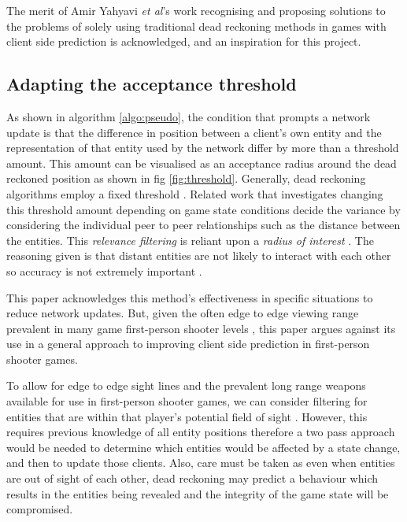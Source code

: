 \documentclass[journal]{IEEEtran}
\begin{document}
The merit of Amir Yahyavi \textit{et al}'s work \cite{yahyavi2011antreckoning} \cite{yahyavi2013interest} recognising and proposing solutions to the problems of solely using traditional dead reckoning methods in games with client side prediction is acknowledged, and an inspiration for this project.

\subsection{Adapting the acceptance threshold} \label{adaptingThreshold}

As shown in algorithm \ref{algo:pseudo}, the condition that prompts a network update is that the difference in position between a client's own entity and the representation of that entity used by the network differ by more than a threshold amount. This amount can be visualised as an acceptance radius around the dead reckoned position as shown in fig \ref{fig:threshold}. Generally, dead reckoning algorithms employ a fixed threshold \cite{cai1999auto}. Related work that investigates changing this threshold amount depending on game state conditions decide the variance by considering the individual peer to peer relationships such as the distance between the entities. This \textit{relevance filtering} is reliant upon a \textit{radius of interest} \cite{rak1996evaluation}. The reasoning given is that distant entities are not likely to interact with each other so accuracy is not extremely important  \cite{cai1999auto} \cite{jaya2016combining}.

This paper acknowledges this method's effectiveness in specific situations to reduce network updates. But, given the often edge to edge viewing range prevalent in many game first-person shooter levels \cite{toby2014tobyscs} \cite{ziervogel2014nag} \cite{cod2018wikibo4}, this paper argues against its use in a general approach to improving client side prediction in first-person shooter games.

To allow for edge to edge sight lines and the prevalent long range weapons available for use in first-person shooter games, we can consider filtering for entities that are within that player’s potential field of sight \cite{cronin2001distributed}. However, this requires previous knowledge of all entity positions therefore a two pass approach would be needed to determine which entities would be affected by a state change, and then to update those clients. Also, care must be taken as even when entities are out of sight of each other, dead reckoning may predict a behaviour which results in the entities being revealed and the integrity of the game state will be compromised.
\end{document}
